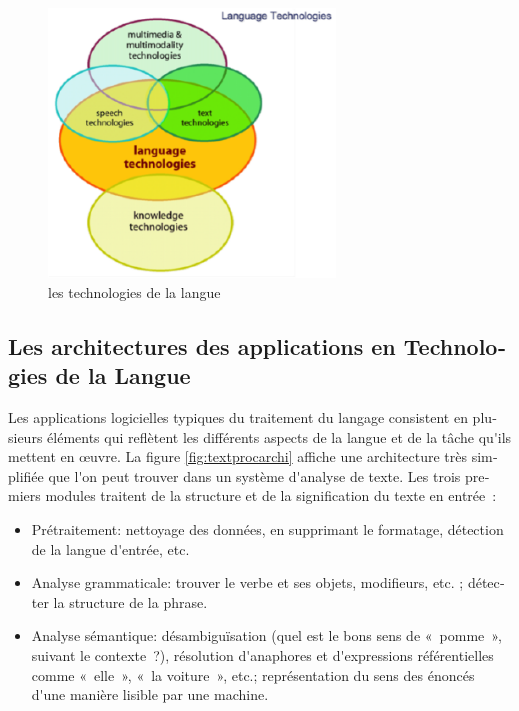 \documentclass[]{../metanetpaper}
\begin{document}
\begin{french}
\begin{multicols}{2}
\begin{figure}[!ht]
\begin{center}
 \includegraphics[width=3.0in]{../_media/french/language_technologies} 
\caption{les technologies de la langue}
\label{fig:languagetechno}
\end{center}
\end{figure}

\subsection{Les architectures des applications en Technologies de la Langue}

Les applications logicielles typiques du traitement du langage
consistent en plusieurs éléments qui reflètent les différents aspects
de la langue et de la tâche qu{\mbox '}ils mettent en œuvre. La figure \ref{fig:textprocarchi}  
 affiche une architecture très simplifiée que l{\mbox '}on peut trouver
dans un système d{\mbox '}analyse de texte. Les trois premiers modules
traitent de la structure et de la signification du texte en entrée~:
\begin{itemize}
\item Prétraitement: nettoyage des données, en supprimant le
  formatage, détection de la langue d{\mbox '}entrée, etc.

\item Analyse grammaticale: trouver le verbe et ses objets,
  modifieurs, etc. ; détecter la structure de la phrase.

\item Analyse sémantique: désambiguïsation (quel est le bons sens de
  «~pomme~», suivant le contexte~?), résolution d{\mbox '}anaphores et
  d{\mbox '}expressions référentielles comme «~elle~», «~la voiture~», etc.;
  représentation du sens des énoncés d{\mbox '}une manière lisible par une
  machine.
\end{itemize}


\end{multicols}
\end{french}
\end{document}
